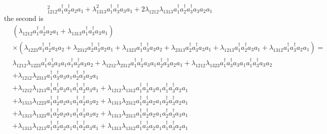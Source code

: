 \documentclass[aps,preprint]{revtex4}%
\begin{document}
\begin{itemize}
\begin{equation}
_{1212}^{2}a_{1}^{\dagger}a_{2}^{\dagger}a_{2}a_{1}+\lambda_{1313}^{2}%
a_{1}^{\dagger}a_{3}^{\dagger}a_{3}a_{1}+2\lambda_{1212}\lambda_{1313}%
a_{1}^{\dagger}a_{2}^{\dagger}a_{3}^{\dagger}a_{3}a_{2}a_{1}%
\end{equation}
the second is
\begin{align}
&  \left(  \lambda_{1212}a_{1}^{\dagger}a_{2}^{\dagger}a_{2}a_{1}%
+\lambda_{1313}a_{1}^{\dagger}a_{3}^{\dagger}a_{3}a_{1}\right) \nonumber\\
&  \times\left(  \lambda_{1223}a_{1}^{\dagger}a_{2}^{\dagger}a_{3}%
a_{2}+\lambda_{2312}a_{2}^{\dagger}a_{3}^{\dagger}a_{2}a_{1}+\lambda
_{1323}a_{1}^{\dagger}a_{3}^{\dagger}a_{3}a_{2}+\lambda_{2313}a_{2}^{\dagger
}a_{3}^{\dagger}a_{3}a_{1}+\lambda_{1213}a_{1}^{\dagger}a_{2}^{\dagger}%
a_{3}a_{1}+\lambda_{1312}a_{1}^{\dagger}a_{3}^{\dagger}a_{2}a_{1}\right)
\left.  =\right. \nonumber\\
&  \lambda_{1212}\lambda_{1223}a_{1}^{\dagger}a_{3}^{\dagger}a_{3}a_{1}%
a_{1}^{\dagger}a_{2}^{\dagger}a_{3}a_{2}+\lambda_{1212}\lambda_{2312}%
a_{1}^{\dagger}a_{3}^{\dagger}a_{3}a_{1}a_{2}^{\dagger}a_{3}^{\dagger}%
a_{2}a_{1}+\lambda_{1212}\lambda_{1323}a_{1}^{\dagger}a_{3}^{\dagger}%
a_{3}a_{1}a_{1}^{\dagger}a_{3}^{\dagger}a_{3}a_{2}\nonumber\\
&  +\lambda_{1212}\lambda_{2313}a_{1}^{\dagger}a_{3}^{\dagger}a_{3}a_{1}%
a_{2}^{\dagger}a_{3}^{\dagger}a_{3}a_{1}\\
&  +\lambda_{1212}\lambda_{1213}a_{1}^{\dagger}a_{3}^{\dagger}a_{3}a_{1}%
a_{1}^{\dagger}a_{2}^{\dagger}a_{3}a_{1}+\lambda_{1212}\lambda_{1312}%
a_{1}^{\dagger}a_{3}^{\dagger}a_{3}a_{1}a_{1}^{\dagger}a_{3}^{\dagger}%
a_{2}a_{1}\nonumber\\
&  +\lambda_{1313}\lambda_{1223}a_{1}^{\dagger}a_{2}^{\dagger}a_{2}a_{1}%
a_{1}^{\dagger}a_{2}^{\dagger}a_{3}a_{2}+\lambda_{1313}\lambda_{2312}%
a_{1}^{\dagger}a_{2}^{\dagger}a_{2}a_{1}a_{2}^{\dagger}a_{3}^{\dagger}%
a_{2}a_{1}\nonumber\\
&  +\lambda_{1313}\lambda_{1323}a_{1}^{\dagger}a_{2}^{\dagger}a_{2}a_{1}%
a_{1}^{\dagger}a_{3}^{\dagger}a_{3}a_{2}+\lambda_{1313}\lambda_{2313}%
a_{1}^{\dagger}a_{2}^{\dagger}a_{2}a_{1}a_{2}^{\dagger}a_{3}^{\dagger}%
a_{3}a_{1}\\
&  +\lambda_{1313}\lambda_{1213}a_{1}^{\dagger}a_{2}^{\dagger}a_{2}a_{1}%
a_{1}^{\dagger}a_{2}^{\dagger}a_{3}a_{1}+\lambda_{1313}\lambda_{1312}%
a_{1}^{\dagger}a_{2}^{\dagger}a_{2}a_{1}a_{1}^{\dagger}a_{3}^{\dagger}%
a_{2}a_{1}%
\end{align}%
\begin{equation}

\end{equation}
\end{itemize}
\end{document}
